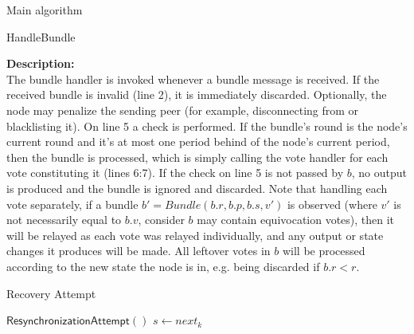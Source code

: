 \documentclass[10pt,a4paper]{article}
\begin{document}
\begin{section}{Main algorithm}
\begin{subsection}{HandleBundle}
\begin{algorithm}[H]
\begin{algorithmic}[1]

        \EndFunction
        \end{algorithmic}
    \end{algorithm}
    
    
    \noindent \textbf{Description:}\\
The bundle handler is invoked whenever a bundle message is received. 
If the received bundle is invalid (line 2), it is immediately discarded. Optionally, the node may
penalize the sending peer (for example, disconnecting from or blacklisting it).
On line 5 a check is performed. If the bundle's round is the node's current round
and it's at most one period behind of the node's current period, 
then the bundle is processed, which is simply calling the vote handler for each 
vote constituting it (lines 6:7). If the check on line 5 is not passed by $b$, no output is produced
and the bundle is ignored and discarded.
Note that handling each vote separately, if a bundle $b\prime = Bundle(b.r, b.p, b.s, v\prime)$ is observed
(where $v\prime$ is not necessarily equal to $b.v$, consider $b$ may contain equivocation votes), then it will be relayed
as each vote was relayed individually, and any output or state changes it produces will be made. All leftover votes 
in $b$ will be processed according to the new state the node is in, e.g. being discarded if $b.r < r$.
    
\end{subsection}


\begin{subsection}{Recovery Attempt}
    \label{ssect:Recovery}

    \begin{algorithm}[H]
        \caption{\underline{Recovery}}
        \label{algo:recovery}
        \begin{algorithmic}[1]

        \State $\mathsf{ResynchronizationAttempt}()$
        \State $s \gets next_k$
    

\end{algorithmic}
\end{algorithm}
\end{subsection}
\end{section}
\end{document}
